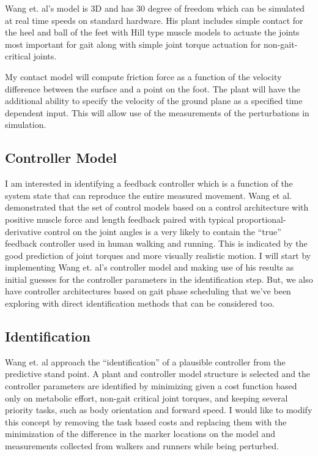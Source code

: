 \documentclass[11pt]{article}
\begin{document}
Wang et. al's model is 3D and has 30 degree of freedom which can be simulated
at real time speeds on standard hardware. His plant includes simple contact for
the heel and ball of the feet with Hill type muscle models to actuate the
joints most important for gait along with simple joint torque actuation for
non-gait-critical joints.

My contact model will compute friction force as a function of the velocity
difference between the surface and a point on the foot. The plant will have the
additional ability to specify the velocity of the ground plane as a specified
time dependent input. This will allow use of the measurements of the
perturbations in simulation.

\subsection*{Controller Model}

I am interested in identifying a feedback controller which is a function of the
system state that can reproduce the entire measured movement. Wang et al.
demonstrated that the set of control models based on a control architecture
with positive muscle force and length feedback paired with typical
proportional-derivative control on the joint angles is a very likely to contain
the ``true'' feedback controller used in human walking and running. This is
indicated by the good prediction of joint torques and more visually realistic
motion. I will start by implementing Wang et. al's controller model and making
use of his results as initial guesses for the controller parameters in the
identification step. But, we also have controller architectures based on gait
phase scheduling that we've been exploring with direct identification methods
that can be considered too.

\subsection*{Identification}

Wang et. al  approach the ``identification'' of a plausible controller from the
predictive stand point. A plant and controller model structure is selected and
the controller parameters are identified by minimizing given a cost function
based only on metabolic effort, non-gait critical joint torques, and keeping
several priority tasks, such as body orientation and forward speed. I would
like to modify this concept by removing the task based costs and replacing them
with the minimization of the difference in the marker locations on the model
and measurements collected from walkers and runners while being perturbed.
\end{document}
